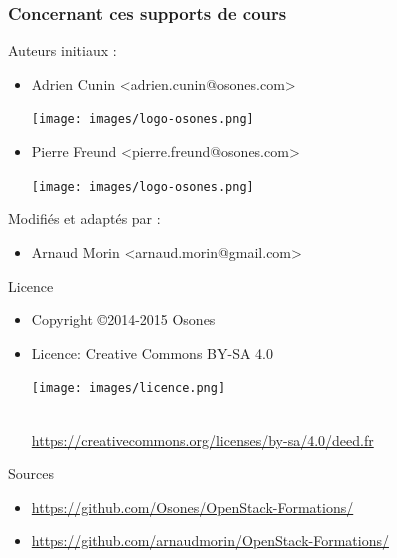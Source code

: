   \begin{frame}
    \frametitle{Concernant ces supports de cours}
    Auteurs initiaux :
    \begin{itemize}
      \item Adrien Cunin \textless adrien.cunin@osones.com\textgreater 
        \begin{minipage}[c]{1.5cm}
          \texttt{[image: images/logo-osones.png]}
        \end{minipage}
      \item Pierre Freund \textless pierre.freund@osones.com\textgreater
        \begin{minipage}[c]{1.5cm}
          \texttt{[image: images/logo-osones.png]}
        \end{minipage}
    \end{itemize}
    
    \vspace{0.3cm}
    Modifiés et adaptés par :
    \begin{itemize}
      \item Arnaud Morin \textless arnaud.morin@gmail.com\textgreater
    \end{itemize}
    
    \vspace{0.3cm}
    Licence
    \begin{itemize}
      \item Copyright \copyright{2014-2015 Osones}
      \item Licence: Creative Commons BY-SA 4.0 
        \begin{minipage}[c]{3cm}
          \texttt{[image: images/licence.png]} 
        \end{minipage}\\
        \url{https://creativecommons.org/licenses/by-sa/4.0/deed.fr}
    \end{itemize}
    
    \vspace{0.3cm}
    Sources
    \begin{itemize}
      \item \url{https://github.com/Osones/OpenStack-Formations/}
      \item \url{https://github.com/arnaudmorin/OpenStack-Formations/}
    \end{itemize}
  \end{frame}


